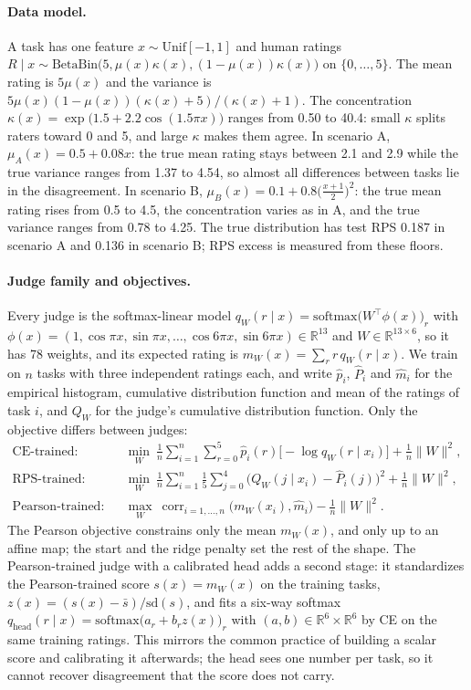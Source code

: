\paragraph{Data model.}
A task has one feature $x\sim\mathrm{Unif}[-1,1]$ and human ratings $R\mid x\sim\mathrm{BetaBin}\bigl(5,\mu(x)\kappa(x),(1-\mu(x))\kappa(x)\bigr)$ on $\{0,\dots,5\}$.
The mean rating is $5\mu(x)$ and the variance is $5\mu(x)(1-\mu(x))(\kappa(x)+5)/(\kappa(x)+1)$.
The concentration $\kappa(x)=\exp\bigl(1.5+2.2\cos(1.5\pi x)\bigr)$ ranges from 0.50 to 40.4: small $\kappa$ splits raters toward 0 and 5, and large $\kappa$ makes them agree.
In scenario A, $\mu_A(x)=0.5+0.08x$: the true mean rating stays between 2.1 and 2.9 while the true variance ranges from 1.37 to 4.54, so almost all differences between tasks lie in the disagreement.
In scenario B, $\mu_B(x)=0.1+0.8\bigl(\tfrac{x+1}{2}\bigr)^2$: the true mean rating rises from 0.5 to 4.5, the concentration varies as in A, and the true variance ranges from 0.78 to 4.25.
The true distribution has test RPS 0.187 in scenario A and 0.136 in scenario B; RPS excess is measured from these floors.

\paragraph{Judge family and objectives.}
Every judge is the softmax-linear model $q_W(r\mid x)=\mathrm{softmax}\bigl(W^\top\phi(x)\bigr)_r$ with $\phi(x)=(1,\cos\pi x,\sin\pi x,\dots,\cos6\pi x,\sin6\pi x)\in\mathbb R^{13}$ and $W\in\mathbb R^{13\times6}$, so it has 78 weights, and its expected rating is $m_W(x)=\sum_r r\,q_W(r\mid x)$.
We train on $n$ tasks with three independent ratings each, and write $\hat p_i$, $\hat P_i$ and $\hat m_i$ for the empirical histogram, cumulative distribution function and mean of the ratings of task $i$, and $Q_W$ for the judge's cumulative distribution function.
Only the objective differs between judges:
\begin{align*}
\text{CE-trained:}\quad & \min_W\ \frac1n\sum_{i=1}^{n}\sum_{r=0}^{5}\hat p_i(r)\bigl[-\log q_W(r\mid x_i)\bigr]+\frac1n\|W\|^2,\\
\text{RPS-trained:}\quad & \min_W\ \frac1n\sum_{i=1}^{n}\frac15\sum_{j=0}^{4}\bigl(Q_W(j\mid x_i)-\hat P_i(j)\bigr)^2+\frac1n\|W\|^2,\\
\text{Pearson-trained:}\quad & \max_W\ \operatorname{corr}_{i=1,\dots,n}\bigl(m_W(x_i),\hat m_i\bigr)-\frac1n\|W\|^2 .
\end{align*}
The Pearson objective constrains only the mean $m_W(x)$, and only up to an affine map; the start and the ridge penalty set the rest of the shape.
The Pearson-trained judge with a calibrated head adds a second stage: it standardizes the Pearson-trained score $s(x)=m_W(x)$ on the training tasks, $z(x)=(s(x)-\bar s)/\mathrm{sd}(s)$, and fits a six-way softmax $q_{\mathrm{head}}(r\mid x)=\mathrm{softmax}\bigl(a_r+b_rz(x)\bigr)_r$ with $(a,b)\in\mathbb R^6\times\mathbb R^6$ by CE on the same training ratings.
This mirrors the common practice of building a scalar score and calibrating it afterwards; the head sees one number per task, so it cannot recover disagreement that the score does not carry.

